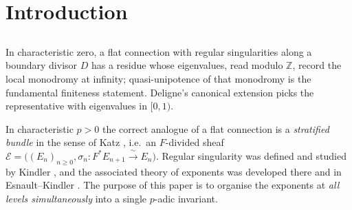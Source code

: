 \documentclass[11pt,reqno]{amsart}
\newcommand{\Zp}{\mathbb{Z}_p}
\newcommand{\ZZ}{\mathbb{Z}}
\newcommand{\cE}{\mathcal{E}}
\newcommand{\MC}{\mathrm{MC}}
\newcommand{\isoto}{\xrightarrow{\ \sim\ }}
\theoremstyle{plain}
\theoremstyle{definition}
\theoremstyle{remark}
\numberwithin{equation}{section}
\begin{document}
\begin{abstract}
Finally,  sketches a candidate $p$-adic middle convolution
$\MC_c$, $c\in\Zp$, built from Gauss--Manin cohomology.  Because local
monodromy is always semisimple, the classical Jordan-block bookkeeping
disappears from the local invariants entering the construction.  This
part of the paper is exploratory: the rank formula for $\MC_c(\cE)$ is
stated as a \emph{conditional} proposition, made precise on the explicit
hypothesis that $\MC_c$ preserves regular singularity and that a
positive-characteristic Euler-characteristic/middle-extension formula
holds (); the exponent rules and rigidity invariance of
$\MC_c$ are recorded only as conjectures, verified so far by explicit
low-rank examples ().  Whether $\MC_c$ preserves regular
singularity at all is the open .
\end{abstract}

\maketitle

\setcounter{tocdepth}{1}
\tableofcontents

\section{Introduction}

\subsection{}
In characteristic zero, a flat connection with regular singularities along
a boundary divisor $D$ has a residue whose eigenvalues, read modulo $\ZZ$,
record the local monodromy at infinity; quasi-unipotence of that monodromy
is the fundamental finiteness statement.  Deligne's canonical extension
picks the representative with eigenvalues in $[0,1)$.

In characteristic $p>0$ the correct analogue of a flat connection is a
\emph{stratified bundle} in the sense of Katz \cite{Katz}, i.e.\ an
$F$-divided sheaf $\cE=\bigl((E_n)_{n\ge0},\sigma_n\colon F^*E_{n+1}\isoto
E_n\bigr)$.  Regular singularity was defined and studied by Kindler
\cite{Kindler}, and the associated theory of exponents was developed there
and in Esnault--Kindler \cite{EsnaultKindler}.  The purpose of this paper
is to organise the exponents at \emph{all levels simultaneously} into a
single $p$-adic invariant.
\end{document}
